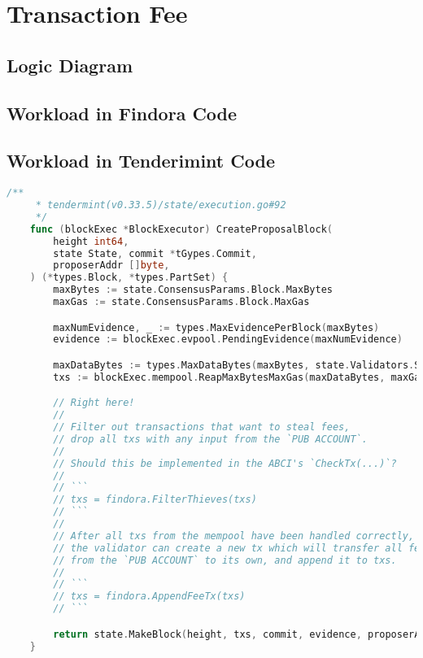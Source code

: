 \section{Transaction Fee}

\subsection{Logic Diagram}

\subsection{Workload in Findora Code}

\subsection{Workload in Tenderimint Code} \label{tendermint:CreateProposalBlock}

\begin{lstlisting}[language=go]
    /**
     * tendermint(v0.33.5)/state/execution.go#92
     */
    func (blockExec *BlockExecutor) CreateProposalBlock(
        height int64,
        state State, commit *tGypes.Commit,
        proposerAddr []byte,
    ) (*types.Block, *types.PartSet) {
        maxBytes := state.ConsensusParams.Block.MaxBytes
        maxGas := state.ConsensusParams.Block.MaxGas

        maxNumEvidence, _ := types.MaxEvidencePerBlock(maxBytes)
        evidence := blockExec.evpool.PendingEvidence(maxNumEvidence)

        maxDataBytes := types.MaxDataBytes(maxBytes, state.Validators.Size(), len(evidence))
        txs := blockExec.mempool.ReapMaxBytesMaxGas(maxDataBytes, maxGas)

        // Right here!
        //
        // Filter out transactions that want to steal fees,
        // drop all txs with any input from the `PUB ACCOUNT`.
        //
        // Should this be implemented in the ABCI's `CheckTx(...)`?
        //
        // ```
        // txs = findora.FilterThieves(txs)
        // ```
        //
        // After all txs from the mempool have been handled correctly,
        // the validator can create a new tx which will transfer all fees
        // from the `PUB ACCOUNT` to its own, and append it to txs.
        //
        // ```
        // txs = findora.AppendFeeTx(txs)
        // ```

        return state.MakeBlock(height, txs, commit, evidence, proposerAddr)
    }
\end{lstlisting}
